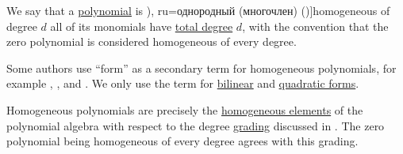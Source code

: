 \begin{definition}\label{def:homogeneous_polynomial}
  We say that a \hyperref[def:polynomial_algebra]{polynomial} is \term[bg=хомогенен (полином) (\cite[58]{ГеновМиховскиМоллов1991Алгебра}), ru=однородный (многочлен) (\cite[314]{Курош1968КурсВысшейАлгебры})]{homogeneous} of degree \( d \) all of its monomials have \hyperref[def:polynomial_degree]{total degree} \( d \), with the convention that the zero polynomial is considered homogeneous of every degree.
\end{definition}
\begin{comments}
  \item Some authors use \enquote{form} as a secondary term for homogeneous polynomials, for example , ,  and . We only use the term for \hyperref[def:bilinear_form]{bilinear} and \hyperref[def:quadratic_form]{quadratic forms}.

  \item Homogeneous polynomials are precisely the \hyperref[def:homogeneous_element]{homogeneous elements} of the polynomial algebra with respect to the degree \hyperref[def:graded_ring]{grading} discussed in . The zero polynomial being homogeneous of every degree agrees with this grading.
\end{comments}

